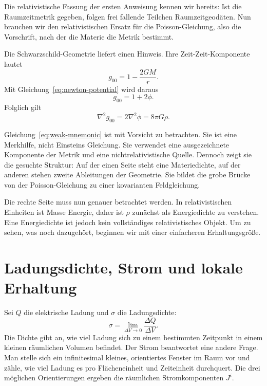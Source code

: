 Die relativistische Fassung der ersten Anweisung kennen wir bereits: Ist die Raumzeitmetrik gegeben, folgen frei fallende Teilchen Raumzeitgeodäten. Nun brauchen wir den relativistischen Ersatz für die Poisson-Gleichung, also die Vorschrift, nach der die Materie die Metrik bestimmt.

Die Schwarzschild-Geometrie liefert einen Hinweis. Ihre Zeit-Zeit-Komponente lautet
\begin{equation}
 g_{00}=1-\frac{2GM}{r}.
\end{equation}
Mit Gleichung~\eqref{eq:newton-potential} wird daraus
\begin{equation}
 g_{00}=1+2\phi.
\end{equation}
Folglich gilt
\begin{equation}
 \nabla^2g_{00}=2\nabla^2\phi=8\pi G\rho.
 \label{eq:weak-mnemonic}
\end{equation}

Gleichung~\eqref{eq:weak-mnemonic} ist mit Vorsicht zu betrachten. Sie ist eine Merkhilfe, nicht Einsteins Gleichung. Sie verwendet eine ausgezeichnete Komponente der Metrik und eine nichtrelativistische Quelle. Dennoch zeigt sie die gesuchte Struktur: Auf der einen Seite steht eine Materiedichte, auf der anderen stehen zweite Ableitungen der Geometrie. Sie bildet die grobe Brücke von der Poisson-Gleichung zu einer kovarianten Feldgleichung.

Die rechte Seite muss nun genauer betrachtet werden. In relativistischen Einheiten ist Masse Energie, daher ist \(\rho\) zunächst als Energiedichte zu verstehen. Eine Energiedichte ist jedoch kein vollständiges relativistisches Objekt. Um zu sehen, was noch dazugehört, beginnen wir mit einer einfacheren Erhaltungsgröße.

\section{Ladungsdichte, Strom und lokale Erhaltung}

Sei \(Q\) die elektrische Ladung und \(\sigma\) die Ladungsdichte:
\begin{equation}
 \sigma=\lim_{\Delta V\to0}\frac{\Delta Q}{\Delta V}.
\end{equation}
Die Dichte gibt an, wie viel Ladung sich zu einem bestimmten Zeitpunkt in einem kleinen räumlichen Volumen befindet. Der Strom beantwortet eine andere Frage. Man stelle sich ein infinitesimal kleines, orientiertes Fenster im Raum vor und zähle, wie viel Ladung es pro Flächeneinheit und Zeiteinheit durchquert. Die drei möglichen Orientierungen ergeben die räumlichen Stromkomponenten \(J^i\).

